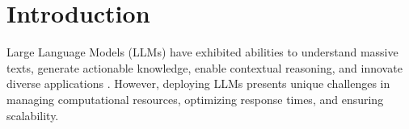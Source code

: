 \section{Introduction}



Large Language Models (LLMs) have exhibited abilities to understand massive texts, generate actionable knowledge, enable contextual reasoning, and innovate diverse applications \cite{radford2018improving, radford2019language, brown2020language, raffel2020exploring, chowdhery2023palm, touvron2023llama}.
However, deploying LLMs presents unique challenges in managing computational resources, optimizing response times, and ensuring scalability. 


